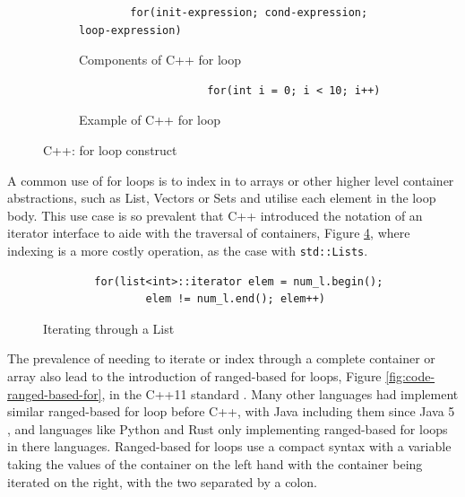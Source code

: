 \documentclass[bsc,frontabs,singlespacing,parskip,deptreport]{infthesis}
\begin{document}
\begin{figure}[H]
    \centering
    \begin{subfigure}[h]{\textwidth}
        \centering
        \begin{verbatim}
        for(init-expression; cond-expression; loop-expression)
        \end{verbatim}
        \caption{Components of C++ for loop}
        \label{fig:code-for-loop-components}
        \vspace{0.40cm}
    \end{subfigure}
    
    \begin{subfigure}[h]{\textwidth}
    \begin{verbatim}
                    for(int i = 0; i < 10; i++)
    \end{verbatim}
    \caption{Example of C++ for loop}
    \centering
    \label{fig:code-for-loop-example}
    \end{subfigure}
    \caption{C++: for loop construct}
    \label{fig:code-for-loop}
\end{figure}

A common use of for loops is to index in to arrays or other higher level container abstractions, such as List, Vectors or Sets and utilise each element in the loop body. This use case is so prevalent that C++ introduced the notation of an iterator interface \cite{ITER_CPP} to aide with the traversal of containers, Figure \ref{fig:code-iterator}, where indexing is a more costly operation, as the case with \texttt{std::Lists}. 

\begin{figure}[H]
    \begin{verbatim}
        for(list<int>::iterator elem = num_l.begin();
                elem != num_l.end(); elem++)
    \end{verbatim}
    \caption{Iterating through a List}
    \centering
    \label{fig:code-iterator}
\end{figure}

The prevalence of needing to iterate or index through a complete container or array also lead to the introduction of ranged-based for loops, Figure \ref{fig:code-ranged-based-for}, in the C++11 standard \cite{} . Many other languages had implement similar ranged-based for loop before C++, with Java including them since Java 5 \cite{JAVA_RANGE}, and languages like Python and Rust only implementing ranged-based for loops in there languages. Ranged-based for loops use a compact syntax with a variable taking the values of the container on the left hand with the container being iterated on the right, with the two separated by a colon. 
\end{document}
